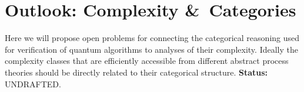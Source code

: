\chapter{Outlook: Complexity \&\ Categories}

Here we will propose open problems for connecting the categorical reasoning used for verification of quantum algorithms to analyses of their complexity.  Ideally the complexity classes that are efficiently accessible from different abstract process theories should be directly related to their categorical structure. {\bf Status:} UNDRAFTED.
